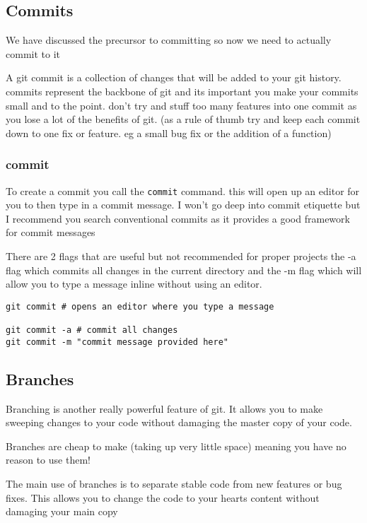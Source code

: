 \documentclass[a4paper]{article}
\begin{document}
\subsection*{Commits}
\label{sec:org5b0f106}
\begin{notes}
We have discussed the precursor to committing so now we need to actually commit
to it

A git commit is a collection of changes that will be added to your git history.
commits represent the backbone of git and its important you make your commits
small and to the point. don't try and stuff too many features into one commit as
you lose a lot of the benefits of git. (as a rule of thumb try and keep each
commit down to one fix or feature. eg a small bug fix or the addition of a
function)
\end{notes}
\subsubsection*{commit}
\label{sec:orgec0c747}
\begin{notes}
To create a commit you call the \texttt{commit} command. this will open up an editor for
you to then type in a commit message. I won't go deep into commit etiquette but I
recommend you search conventional commits as it provides a good framework for
commit messages

There are 2 flags that are useful but not recommended for proper projects
the -a flag which commits all changes in the current directory
and the -m flag which will allow you to type a message inline without using an
editor.
\end{notes}

\begin{verbatim}
git commit # opens an editor where you type a message

git commit -a # commit all changes
git commit -m "commit message provided here"
\end{verbatim}
\subsection*{Branches}
\label{sec:org8b8ce90}
\begin{notes}
Branching is another really powerful feature of git. It allows you to make
sweeping changes to your code without damaging the master copy of your code.

Branches are cheap to make (taking up very little space) meaning you have no
reason to use them!

The main use of branches is to separate stable code from new features or bug
fixes. This allows you to change the code to your hearts content without
damaging your main copy
\end{notes}
\end{document}
